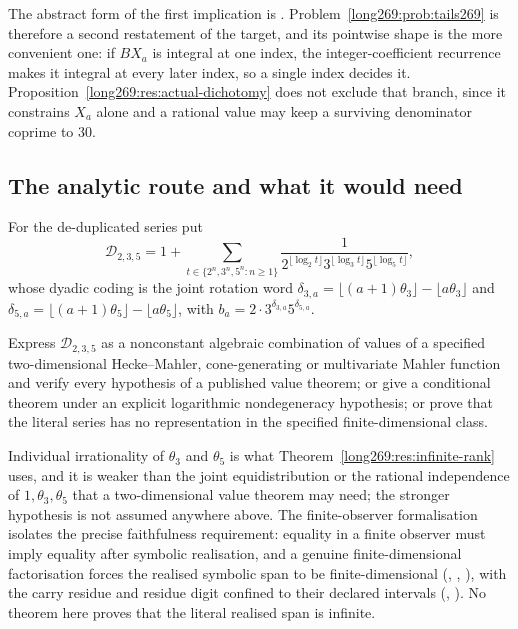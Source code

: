 \documentclass[11pt]{article}
\begin{document}
\noindent The abstract form of the first implication is
.
Problem~\ref{long269:prob:tails269} is therefore a second restatement of the target,
and its pointwise shape is the more convenient one: if $BX_a$ is integral at one index, the integer-coefficient recurrence
makes it integral at every later index, so a single index decides it.
Proposition~\ref{long269:res:actual-dichotomy} does not exclude that branch, since it
constrains $X_a$ alone and a rational value may keep a surviving denominator
coprime to $30$.

\subsection{The analytic route and what it would need}

For the de-duplicated series put
\[
 \mathcal D_{2,3,5}=1+
 \sum_{t\in\{2^{n},3^{n},5^{n}:n\ge1\}}
 \frac{1}{2^{\lfloor\log_2t\rfloor}3^{\lfloor\log_3t\rfloor}
           5^{\lfloor\log_5t\rfloor}} ,
\]
whose dyadic coding is the joint rotation word
$\delta_{3,a}=\lfloor(a+1)\theta_3\rfloor-\lfloor a\theta_3\rfloor$ and
$\delta_{5,a}=\lfloor(a+1)\theta_5\rfloor-\lfloor a\theta_5\rfloor$, with
$b_a=2\cdot3^{\delta_{3,a}}5^{\delta_{5,a}}$.

\begin{problem}
\label{long269:prob:representation}
Express $\mathcal D_{2,3,5}$ as a nonconstant algebraic combination of values
of a specified two-dimensional Hecke--Mahler, cone-generating or multivariate
Mahler function and verify every hypothesis of a published value theorem; or
give a conditional theorem under an explicit logarithmic nondegeneracy
hypothesis; or prove that the literal series has no representation in the
specified finite-dimensional class.
\end{problem}

Individual irrationality of $\theta_3$ and $\theta_5$ is what
Theorem~\ref{long269:res:infinite-rank} uses, and it is weaker than the joint
equidistribution or the rational independence of $1,\theta_3,\theta_5$ that a
two-dimensional value theorem may need; the stronger hypothesis is not assumed
anywhere above.  The finite-observer formalisation isolates the precise
faithfulness requirement: equality in a finite observer must imply equality
after symbolic realisation, and a genuine finite-dimensional factorisation
forces the realised symbolic span to be finite-dimensional
(,
,
),
with the carry residue and residue digit confined to their declared intervals
(,
).  No theorem here proves that the literal realised span is infinite.
\end{document}
